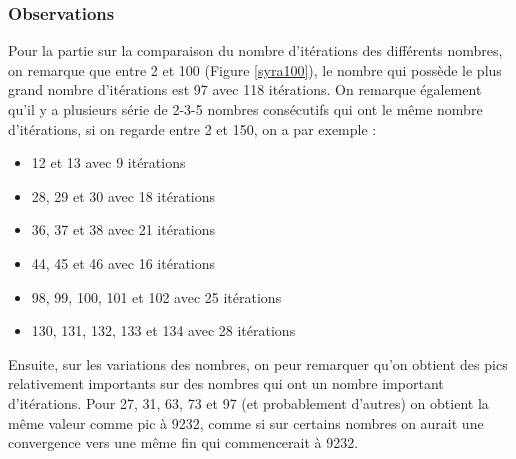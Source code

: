 \subsubsection{Observations}

Pour la partie sur la comparaison du nombre d'itérations des différents nombres, on remarque que entre 2 et 100 (Figure \ref{syra100}), le nombre qui possède le plus grand nombre d'itérations est 97 avec 118 itérations. On remarque également qu'il y a plusieurs série de 2-3-5 nombres consécutifs qui ont le même nombre d'itérations, si on regarde entre 2 et 150, on a par exemple : 
\begin{itemize}
\item 12 et 13 avec 9 itérations
\item 28, 29 et 30 avec 18 itérations
\item 36, 37 et 38 avec 21 itérations
\item 44, 45 et 46 avec 16 itérations
\item 98, 99, 100, 101 et 102 avec 25 itérations
\item 130, 131, 132, 133 et 134 avec 28 itérations
\end{itemize}

Ensuite, sur les variations des nombres, on peur remarquer qu'on obtient des pics relativement importants sur des nombres qui ont un nombre important d'itérations. Pour 27, 31, 63, 73 et 97 (et probablement d'autres) on obtient la même valeur comme pic à 9232, comme si sur certains nombres on aurait une convergence vers une même fin qui commencerait à 9232.


